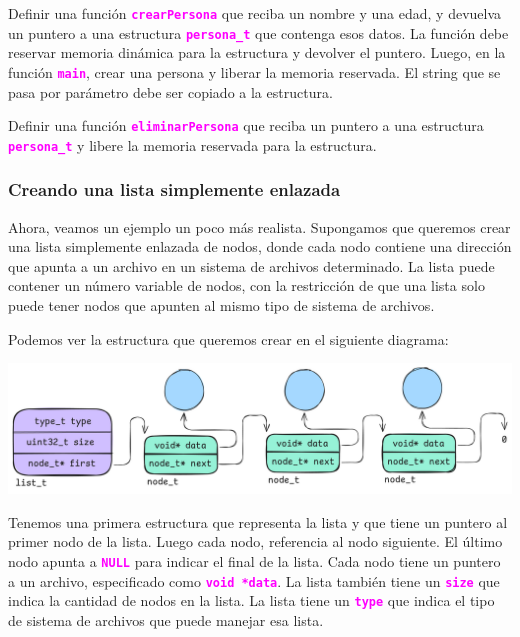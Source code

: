 \documentclass[]{scrartcl}
\newcommand{\hl}[1]{\textcolor{magenta}{\textbf{\texttt{#1}}}}
\begin{document}
\begin{exbox}
Definir una función \hl{crearPersona} que reciba un nombre y una edad, y devuelva un puntero a una estructura \hl{persona\_t} que contenga esos datos. La función debe reservar memoria dinámica para la estructura y devolver el puntero. Luego, en la función \hl{main}, crear una persona y liberar la memoria reservada.
El string que se pasa por parámetro debe ser copiado a la estructura.
\end{exbox}

\begin{exbox}
  Definir una función \hl{eliminarPersona} que reciba un puntero a una estructura \hl{persona\_t} y libere la memoria reservada para la estructura. 
\end{exbox}

\subsubsection*{Creando una lista simplemente enlazada}

Ahora, veamos un ejemplo un poco más realista. Supongamos que queremos crear una lista simplemente enlazada de nodos, donde cada nodo contiene una dirección que apunta a un archivo en un sistema de archivos determinado. La lista puede contener un número variable de nodos, con la restricción de que una lista solo puede tener nodos que apunten al mismo tipo de sistema de archivos.

Podemos ver la estructura que queremos crear en el siguiente diagrama:

\begin{center}
  \includegraphics[scale=0.2]{./img/linkedlist.png}  
\end{center}

Tenemos una primera estructura que representa la lista y que tiene un puntero al primer nodo de la lista. Luego cada nodo, referencia al nodo siguiente. El último nodo apunta a \hl{NULL} para indicar el final de la lista. Cada nodo tiene un puntero a un archivo, especificado como \hl{void *data}. La lista también tiene un \hl{size} que indica la cantidad de nodos en la lista. La lista tiene un \hl{type} que indica el tipo de sistema de archivos que puede manejar esa lista. 
\end{document}
